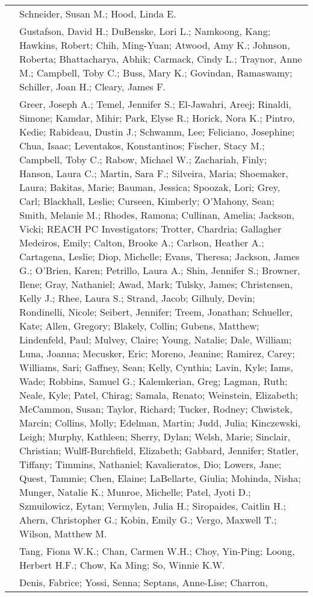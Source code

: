 \documentclass[
]{article}
\begin{document}
\begin{longtable}[]{@{}
  >{\raggedleft\arraybackslash}p{}
  >{\raggedright\arraybackslash}p{}@{}}
10 & Schneider, Susan M.; Hood, Linda E. \\
11 & Gustafson, David H.; DuBenske, Lori L.; Namkoong, Kang; Hawkins,
Robert; Chih, Ming-Yuan; Atwood, Amy K.; Johnson, Roberta; Bhattacharya,
Abhik; Carmack, Cindy L.; Traynor, Anne M.; Campbell, Toby C.; Buss,
Mary K.; Govindan, Ramaswamy; Schiller, Joan H.; Cleary, James F. \\
12 & Greer, Joseph A.; Temel, Jennifer S.; El-Jawahri, Areej; Rinaldi,
Simone; Kamdar, Mihir; Park, Elyse R.; Horick, Nora K.; Pintro, Kedie;
Rabideau, Dustin J.; Schwamm, Lee; Feliciano, Josephine; Chua, Isaac;
Leventakos, Konstantinos; Fischer, Stacy M.; Campbell, Toby C.; Rabow,
Michael W.; Zachariah, Finly; Hanson, Laura C.; Martin, Sara F.;
Silveira, Maria; Shoemaker, Laura; Bakitas, Marie; Bauman, Jessica;
Spoozak, Lori; Grey, Carl; Blackhall, Leslie; Curseen, Kimberly;
O'Mahony, Sean; Smith, Melanie M.; Rhodes, Ramona; Cullinan, Amelia;
Jackson, Vicki; REACH PC Investigators; Trotter, Chardria; Gallagher
Medeiros, Emily; Calton, Brooke A.; Carlson, Heather A.; Cartagena,
Leslie; Diop, Michelle; Evans, Theresa; Jackson, James G.; O'Brien,
Karen; Petrillo, Laura A.; Shin, Jennifer S.; Browner, Ilene; Gray,
Nathaniel; Awad, Mark; Tulsky, James; Christensen, Kelly J.; Rhee, Laura
S.; Strand, Jacob; Gilhuly, Devin; Rondinelli, Nicole; Seibert,
Jennifer; Treem, Jonathan; Schueller, Kate; Allen, Gregory; Blakely,
Collin; Gubens, Matthew; Lindenfeld, Paul; Mulvey, Claire; Young,
Natalie; Dale, William; Luna, Joanna; Mecusker, Eric; Moreno, Jeanine;
Ramirez, Carey; Williams, Sari; Gaffney, Sean; Kelly, Cynthia; Lavin,
Kyle; Iams, Wade; Robbins, Samuel G.; Kalemkerian, Greg; Lagman, Ruth;
Neale, Kyle; Patel, Chirag; Samala, Renato; Weinstein, Elizabeth;
McCammon, Susan; Taylor, Richard; Tucker, Rodney; Chwistek, Marcin;
Collins, Molly; Edelman, Martin; Judd, Julia; Kinczewski, Leigh; Murphy,
Kathleen; Sherry, Dylan; Welsh, Marie; Sinclair, Christian;
Wulff-Burchfield, Elizabeth; Gabbard, Jennifer; Statler, Tiffany;
Timmins, Nathaniel; Kavalieratos, Dio; Lowers, Jane; Quest, Tammie;
Chen, Elaine; LaBellarte, Giulia; Mohinda, Nisha; Munger, Natalie K.;
Munroe, Michelle; Patel, Jyoti D.; Szmuilowicz, Eytan; Vermylen, Julia
H.; Siropaides, Caitlin H.; Ahern, Christopher G.; Kobin, Emily G.;
Vergo, Maxwell T.; Wilson, Matthew M. \\
13 & Tang, Fiona W.K.; Chan, Carmen W.H.; Choy, Yin-Ping; Loong, Herbert
H.F.; Chow, Ka Ming; So, Winnie K.W. \\
14 & Denis, Fabrice; Yossi, Senna; Septans, Anne-Lise; Charron,

\end{longtable}
\end{document}
